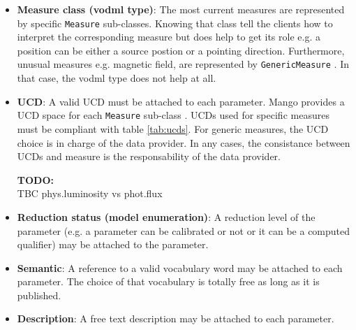 \documentclass[11pt,a4paper]{ivoa}
\newcommand{\TODO}[1]{%
    \noindent%
    \colorbox{todocolor}{%
            \parbox{0.85\linewidth}{\sffamily \textbf{TODO:}\\
            #1}
    }%
    \vspace{2pt}

}
\begin{document}
\begin{itemize}
    \item \textbf{Measure class (vodml type)}: The most current measures are represented by specific  \texttt{Measure} sub-classes.
              Knowing that class tell the clients  how to interpret the corresponding measure but does help to get its role e.g. a position can be either a source postion or a pointing direction.
              Furthermore, unusual measures e.g. magnetic field,  are represented by  \texttt{GenericMeasure} . 
              In that case, the vodml type does not help at all.
    \item \textbf{UCD}: A valid UCD must be attached to each parameter. 
                                 Mango provides a UCD space for each \texttt{Measure} sub-class . 
                                 UCDs used for specific measures must be compliant with table \ref{tab:ucds}. 
                                 For generic measures, the UCD choice is in charge of the data provider. 
                                 In any cases, the consistance between UCDs and measure is the responsability of the data provider.
\TODO{TBC phys.luminosity  vs phot.flux}
    \item \textbf{Reduction status (model enumeration)}: A reduction level of the parameter (e.g. a parameter can be calibrated or not or it can be a computed qualifier) may be attached to the parameter.
    \item \textbf{Semantic}: A reference to  a valid vocabulary word may be attached to each parameter. The choice of that vocabulary is totally free as long as it is published.
    \item \textbf{Description}: A free text description may be attached to each parameter.
 \end{itemize}
\end{document}
